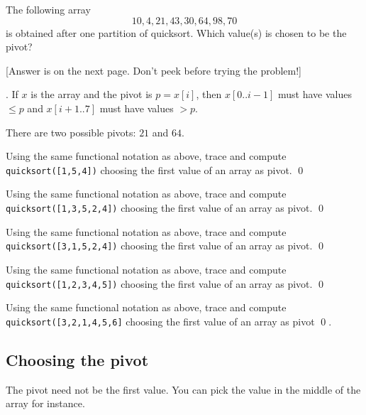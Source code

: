 \newpage
\begin{ex}
  The following array
  \[
  10, 4, 21, 43, 30, 64, 98, 70
  \]
  is obtained after one partition of quicksort.
  Which value(s) is chosen to be the pivot?

  [Answer is on the next page. Don't peek before trying the problem!]
\end{ex}

\newpage

\SOLUTION.
If $x$ is the array and the pivot is $p = x[i]$, then
$x[0..i-1]$ must have values $\leq p$ and
$x[i+1..7]$ must have values $> p$.

There are two possible pivots:
$21$ and $64$.

\newpage
\begin{ex}
Using the same functional notation as above, trace and compute
\texttt{quicksort([1,5,4])} choosing the first value of an array as pivot.
\qed
\end{ex}

\newpage
\begin{ex}
Using the same functional notation as above, trace and compute
\texttt{quicksort([1,3,5,2,4])} choosing the first value of an array as pivot.
\qed
\end{ex}

\newpage
\begin{ex}
Using the same functional notation as above, trace and compute
\texttt{quicksort([3,1,5,2,4])} choosing the first value of an array as pivot.
\qed
\end{ex}

\newpage
\begin{ex}
Using the same functional notation as above, trace and compute
\texttt{quicksort([1,2,3,4,5])} choosing the first value of an array as pivot.
\qed
\end{ex}

\newpage
\begin{ex}
Using the same functional notation as above, trace and compute
\texttt{quicksort([3,2,1,4,5,6]} choosing the first value of an array as pivot
\qed.
\end{ex}

\newpage
\subsection{Choosing the pivot}

The pivot need not be the first value.
You can pick the value in the middle of the array for instance.


